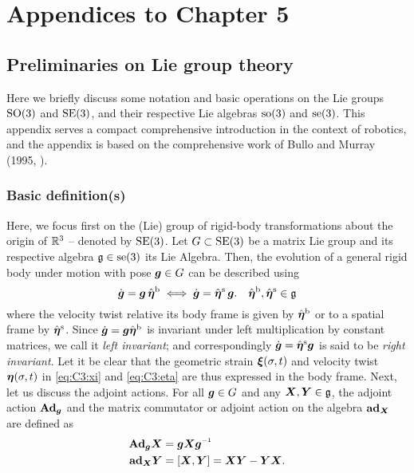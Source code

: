 \chapter{Appendices to Chapter 5}
\vspace{-5mm}
\section{Preliminaries on Lie group theory} 
\label{app:C3:liegroup}
Here we briefly discuss some notation and basic operations on the Lie groups $\textup{\textrm{SO}}(3)$ and $\textup{\textrm{SE}}(3)$, and their respective Lie algebras $\textup{\textrm{so}}(3)$ and $\textup{\textrm{se}}(3)$. This appendix serves a compact comprehensive introduction in the context of robotics, and the appendix is based on the comprehensive work of Bullo and Murray (1995, \cite{Bullo1995}).

\subsection{Basic definition(s)}
Here, we focus first on the (Lie) group of rigid-body transformations about the origin of $\mathbb{R}^3$ -- denoted by $\textup{\textrm{SE}}(3)$. Let $G \subset \textup{\textrm{SE}}(3)$ be a matrix Lie group and its respective algebra $\mathfrak{g} \in \textup{\textrm{se}}(3)$ its Lie Algebra. Then, the evolution of a general rigid body under motion with pose ${\boldsymbol{g}} \in G$ can be described using 
%
\begin{equation}
\dot{{\boldsymbol{g}}} = {\boldsymbol{g}}\, \hat{{\boldsymbol{\eta}}}^{\textrm{b}} \;  \Longleftrightarrow  \; \dot{{\boldsymbol{g}}} = \hat{{\boldsymbol{\eta}}}^{\textrm{s}}\,{\boldsymbol{g}}. \quad \hat{{\boldsymbol{\eta}}}^{\textrm{b}},\hat{{\boldsymbol{\eta}}}^{\textrm{s}} \in \mathfrak{g}
\end{equation}
%
where the velocity twist relative its body frame is given by $\hat{{\boldsymbol{\eta}}}^\textrm{b}$ or to a spatial frame by $\hat{{\boldsymbol{\eta}}}^\textrm{s}$. Since $\dot{{\boldsymbol{g}}} = {\boldsymbol{g}} \hat{{\boldsymbol{\eta}}}^{\textrm{b}}$ is invariant under left multiplication by constant matrices, we call it \textit{left invariant}; and correspondingly $\dot{{\boldsymbol{g}}} = \hat{{\boldsymbol{\eta}}}^{\textrm{s}} {\boldsymbol{g}} $ is said to be \textit{right invariant}. Let it be clear that the geometric strain ${\boldsymbol{\xi}}(\sigma,t)$ and velocity twist ${\boldsymbol{\eta}}(\sigma,t)$ in \eqref{eq:C3:xi} and \eqref{eq:C3:eta} are thus expressed in the body frame. Next, let us discuss the adjoint actions. For all ${\boldsymbol{g}} \in G$ and any ${\boldsymbol{X}},{\boldsymbol{Y}} \in \mathfrak{g}$, the adjoint action $\textbf{Ad}_{{\boldsymbol{g}}}$ and the matrix commutator or adjoint action on the algebra $\textbf{ad}_{{\boldsymbol{X}}}$ are defined as 
%
\begin{align}
\Ad_{\gB} \XB & = \gB \XB \gB \inv \label{eq:C3:A1:adjoint1}\\
\ad_{\XB} \YB & = \left[\XB,\YB\right]  = \XB \YB - \YB\XB. \label{eq:C3:A1:adjoint2}
\end{align}
